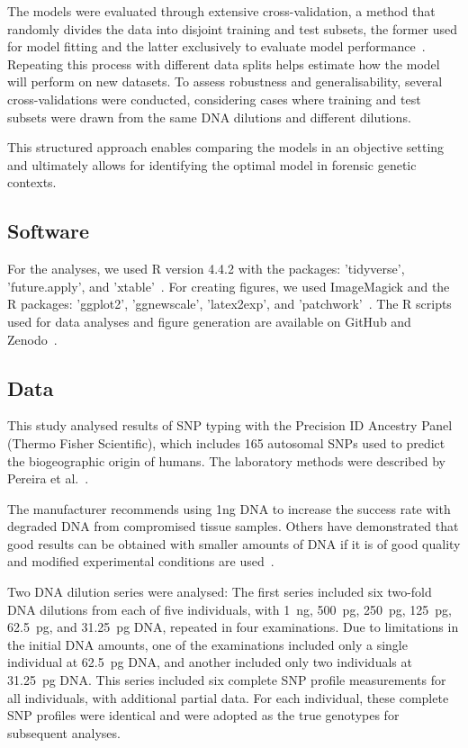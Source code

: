 \documentclass[preprint,5p,times,11pt]{elsarticle}
\begin{document}
The models were evaluated through extensive cross-validation, a method that randomly divides the data into disjoint training and test subsets, the former used for model fitting and the latter exclusively to evaluate model performance~\cite{stone, picard}.
Repeating this process with different data splits helps estimate how the model will perform on new datasets.
To assess robustness and generalisability, several cross-validations were conducted, considering cases where training and test subsets were drawn from the same DNA dilutions and different dilutions.

This structured approach enables comparing the models in an objective setting and ultimately allows for identifying the optimal model in forensic genetic contexts.


\subsection{Software}
For the analyses, we used R version 4.4.2 with the packages: 'tidyverse', 'future.apply', and 'xtable'~\cite{r, tidyverse1, tidyverse2, future1, future2, futureapply, xtable}.
For creating figures, we used ImageMagick and the R packages: 'ggplot2', 'ggnewscale', 'latex2exp', and 'patchwork'~\cite{imagemagick, ggplot, ggnewscale, latex2exp, patchwork}.
The R scripts used for data analyses and figure generation are available on GitHub and Zenodo~\cite{scripts}.


\subsection{Data}
This study analysed results of SNP typing with the Precision ID Ancestry Panel (Thermo Fisher Scientific), which includes 165 autosomal SNPs used to predict the biogeographic origin of humans.
The laboratory methods were described by Pereira et al.~\cite{pereira}.

The manufacturer recommends using 1ng DNA to increase the success rate with degraded DNA from compromised tissue samples.
Others have demonstrated that good results can be obtained with smaller amounts of DNA if it is of good quality and modified experimental conditions are used~\cite{alasfi}.

Two DNA dilution series were analysed:
The first series included six two-fold DNA dilutions from each of five individuals, with \SI{1}{\ng}, \SI{500}{\pg}, \SI{250}{\pg}, \SI{125}{\pg}, \SI{62.5}{\pg}, and \SI{31.25}{\pg} DNA, repeated in four examinations.
Due to limitations in the initial DNA amounts, one of the examinations included only a single individual at \SI{62.5}{\pg} DNA, and another included only two individuals at \SI{31.25}{\pg} DNA.
This series included six complete SNP profile measurements for all individuals, with additional partial data.
For each individual, these complete SNP profiles were identical and were adopted as the true genotypes for subsequent analyses.
\end{document}

